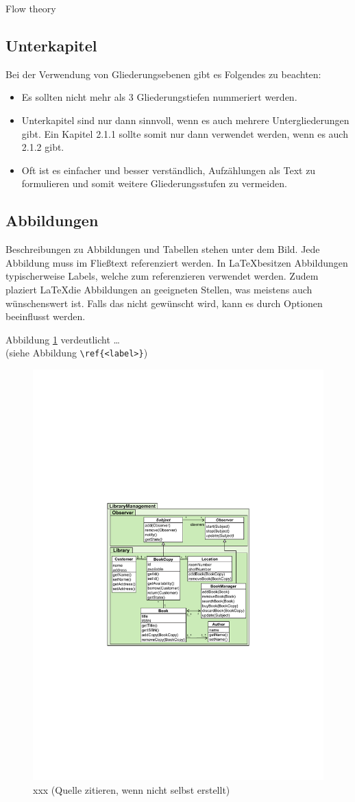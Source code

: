 Flow theory

\subsection{Unterkapitel}

Bei der Verwendung von Gliederungsebenen gibt es Folgendes zu beachten:
\begin{itemize}
	\item Es sollten nicht mehr als 3 Gliederungstiefen nummeriert werden.
	\item Unterkapitel sind nur dann sinnvoll, wenn es auch mehrere Untergliederungen gibt. Ein Kapitel 2.1.1 sollte somit nur dann verwendet werden, wenn es auch 2.1.2 gibt.
	\item Oft ist es einfacher und besser verständlich, Aufzählungen als Text zu formulieren und somit weitere Gliederungsstufen zu vermeiden.
\end{itemize}

\subsection{Abbildungen}
\label{sec:abbildungen}

Beschreibungen zu Abbildungen und Tabellen stehen unter dem Bild. Jede Abbildung muss im Fließtext referenziert werden. In \LaTeX besitzen Abbildungen typischerweise Labels, welche zum referenzieren verwendet werden. Zudem plaziert \LaTeX die Abbildungen an geeigneten Stellen, was meistens auch wünschenswert ist. Falls das nicht gewünscht wird, kann es durch Optionen beeinflusst werden.

Abbildung \ref{fig:xxx} verdeutlicht  \dots\\
(siehe Abbildung \verb|\ref{<label>}|)

\begin{figure}
	\centering
	\includegraphics[width=0.4\linewidth]{figures/figure1}
	\caption{xxx (Quelle zitieren, wenn nicht selbst erstellt)}
	\label{fig:xxx}
\end{figure}

